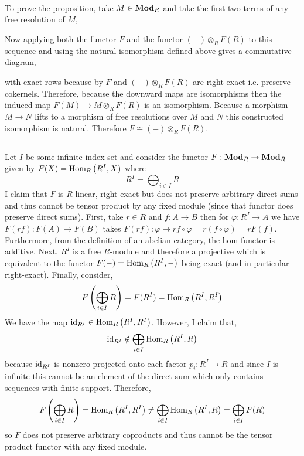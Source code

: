 \documentclass[12pt]{article}
\begin{document}
\bigskip\\
To prove the proposition, take $M \in \mathbf{Mod}_{R}$ and take the first two terms of any free resolution of $M$,
\begin{center}
\end{center}
Now applying both the functor $F$ and the functor $(-) \otimes_R F(R)$ to this sequence and using the natural isomorphism defined above gives a commutative diagram,
\begin{center}
\end{center}
with exact rows because by $F$ and $(-) \otimes_R F(R)$ are right-exact i.e. preserve cokernels. Therefore, because the downward maps are isomorphisms then the induced map $F(M) \to M \otimes_R F(R)$ is an isomorphism. Because a morphism $M \to N$ lifts to a morphism of free resolutions over $M$ and $N$ this constructed isomorphism is natural. Therefore $F \cong (-) \otimes_R F(R)$.  

\subsection{}

Let $I$ be some infinite index set and consider the functor $F : \mathbf{Mod}_{R} \to \mathbf{Mod}_{R}$ given by $F(X) = \mathrm{Hom}_{R} \left( R^{I}, X \right)$ where 
\[ R^I = \bigoplus_{i \in I} R \]
I claim that $F$ is $R$-linear, right-exact but does not preserve arbitrary direct sums and thus cannot be tensor product by any fixed module (since that functor does preserve direct sums). First, take $r \in R$ and $f : A \to B$ then for $\varphi : R^I \to A$ we have $F(rf) : F(A) \to F(B)$ takes $F(rf) : \varphi \mapsto rf \circ \varphi = r(f \circ \varphi) = r F(f)$. Furthermore, from the definition of an abelian category, the hom functor is additive. Next, $R^I$ is a free $R$-module and therefore a projective which is equivalent to the functor $F(-) = \mathrm{Hom}_{R} \left( R^I, - \right)$ being exact (and in particular right-exact). Finally, consider,
\[ F\left( \bigoplus_{i \in I} R \right) = F(R^I) = \mathrm{Hom}_{R} \left( R^I, R^I \right) \]
We have the map $\mathrm{id}_{R^I} \in \mathrm{Hom}_{R} \left( R^I, R^I \right)$. However, I claim that,
\[ \mathrm{id}_{R^I} \notin \bigoplus_{i \in I} \mathrm{Hom}_{R} \left( R^I, R \right) \]
because $\mathrm{id}_{R^I}$ is nonzero projected onto each factor $p_i : R^I \to R$ and since $I$ is infinite this cannot be an element of the direct sum which only contains sequences with finite support. Therefore,
\[ F\left( \bigoplus_{i \in I} R \right) = \mathrm{Hom}_{R} \left( R^I, R^I \right) \neq \bigoplus_{i \in I} \mathrm{Hom}_{R} \left( R^I, R \right) = \bigoplus_{i \in I} F(R) \]
so $F$ does not preserve arbitrary coproducts and thus cannot be the tensor product functor with any fixed module. 
\end{document}
